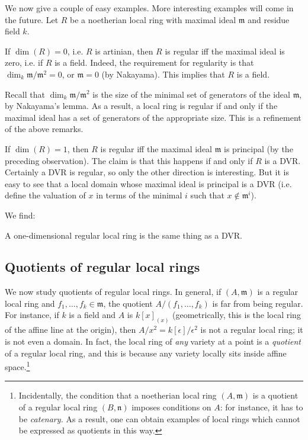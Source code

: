 We now give a couple of easy examples. More interesting examples will come in
the future.
Let $R$ be a noetherian local ring with maximal ideal $\mathfrak{m}$ and
residue field $k$.

\begin{example} 
If $\dim(R)=0$, i.e. $R$ is artinian, then $R$ is regular iff the maximal ideal
is zero, i.e. if $R$ is a field.
Indeed, the requirement for regularity is that $\dim_k \mathfrak{m}/\mathfrak{m}^2 = 0$, or
$\mathfrak{m} = 0$ (by Nakayama). This implies that $R$ is a field.
\end{example} 

Recall that $\dim_k \mathfrak{m}/\mathfrak{m}^2$ is the size of the minimal set
of generators of the ideal $\mathfrak{m}$, by Nakayama's lemma. As a result, a
local ring is regular if and only if the maximal ideal has a set of generators
of the appropriate size. This is a refinement of the above remarks.

\begin{example} 
If $\dim(R) =1$, then $R$ is regular iff the maximal ideal $\mathfrak{m}$ is
principal (by the preceding observation). 
The claim is that this happens if and only if $R$ is  a DVR. Certainly a DVR is
regular, so only the other direction is interesting. 
But it is easy to see that a local domain whose maximal ideal is principal is a
DVR (i.e. define the valuation of $x$ in terms of the minimal $i$ such that $x
\notin \mathfrak{m}^i$).
\end{example} 
We find:
\begin{proposition} 
A one-dimensional regular local ring is the same thing as a DVR.
\end{proposition} 


\subsection{Quotients of regular local rings}

We now study quotients of regular local rings. 
In general, if $(A, \mathfrak{m})$ is a regular local ring and $f_1, \dots, f_k \in
\mathfrak{m}$, the quotient $A/(f_1, \dots, f_k)$ is far from being regular. 
For instance, if $k$ is a field and $A$ is $k[x]_{(x)}$ (geometrically, this is
the local ring of the affine line at the origin), then $A/x^2 =
k[\epsilon]/\epsilon^2$ is not a regular local ring; it is not even a domain. 
In fact, the local ring of \emph{any} variety at a point is a \emph{quotient} of a
regular local ring, and this is because any variety locally sits inside affine
space.\footnote{Incidentally, the condition that a noetherian local ring $(A,
\mathfrak{m})$ is a
quotient of a regular local ring  $(B, \mathfrak{n})$ imposes conditions on
$A$: for instance, it has to be \emph{catenary.} As a result, one can obtain
examples of local rings which cannot be expressed as quotients in this way.}

